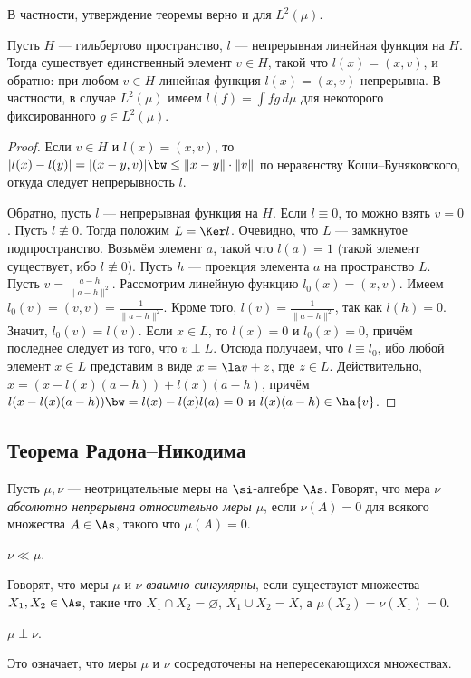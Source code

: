 \documentclass[10pt]{article}
\begin{document}
В частности, утверждение теоремы верно и для $L^2(\mu)$.

\begin{imp}\label{functional}
Пусть $H$ --- гильбертово пространство, $l$ --- непрерывная линейная
функция на $H$. Тогда существует единственный элемент $v\in H$,
такой что $l(x)=(x,v)$, и обратно: при любом $v\in H$ линейная
функция $l(x)=(x,v)$ непрерывна. В частности, в случае $L^2(\mu)$
имеем $l(f)=\int fg\,d\mu$ для некоторого фиксированного $g\in
L^2(\mu)$.
\end{imp}
\begin{proof}
Если $v\in H$ и $l(x)=(x,v)$, то $|l(x)-l(y)|=|(x-y,v)|\bw
\le\|x-y\|\cdot\|v\|$ по неравенству Коши--Буняковского, откуда
следует непрерывность $l$.

Обратно, пусть $l$ --- непрерывная функция на $H$. Если $l\equiv0$,
то можно взять $v=0$. Пусть $l\not\equiv 0$. Тогда положим $L=\Ker
l$. Очевидно, что $L$ --- замкнутое подпространство. Возьмём элемент
$a$, такой что $l(a)=1$ (такой элемент существует, ибо $l\not\equiv
0$). Пусть $h$ --- проекция элемента $a$ на пространство $L$. Пусть
$v=\frac{a-h}{\|a-h\|^2}$. Рассмотрим линейную функцию
$l_0(x)=(x,v)$. Имеем $l_0(v)=(v,v)=\frac1{\|a-h\|^2}$. Кроме того,
$l(v)=\frac1{\|a-h\|^2}$, так как $l(h)=0$. Значит, $l_0(v)=l(v)$.
Если $x\in L$, то $l(x)=0$ и $l_0(x)=0$, причём последнее следует из
того, что $v\perp L$. Отсюда получаем, что $l\equiv l_0$, ибо любой
элемент $x\in L$ представим в виде $x=\la v+z$, где $z\in L$.
Действительно, $x=(x-l(x)(a-h))+l(x)(a-h)$, причём
$l(x-l(x)(a-h))\bw =l(x)-l(x)l(a)=0$ и $l(x)(a-h)\in \ha{v}$.
\end{proof}

\subsection{Теорема Радона--Никодима}

\begin{df}
Пусть $\mu,\nu$ --- неотрицательные меры на $\si$-алгебре $\As$.
Говорят, что мера $\nu$ \emph{абсолютно непрерывна относительно меры
$\mu$}, если $\nu(A)=0$ для всякого множества $A\in\As$, такого что
$\mu(A)=0$.
\end{df}
\begin{denote}
$\nu\ll\mu$.
\end{denote}
\begin{df}
Говорят, что меры $\mu$ и $\nu$ \emph{взаимно сингулярны}, если
существуют множества $X_1, X_2\in \As$, такие что $X_1\cap
X_2=\varnothing$, $X_1\cup X_2=X$, а $\mu(X_2)=\nu(X_1)=0$.
\end{df}
\begin{denote}
$\mu\perp\nu$.
\end{denote}
Это означает, что меры $\mu$ и $\nu$ сосредоточены на
непересекающихся множествах.
\end{document}
